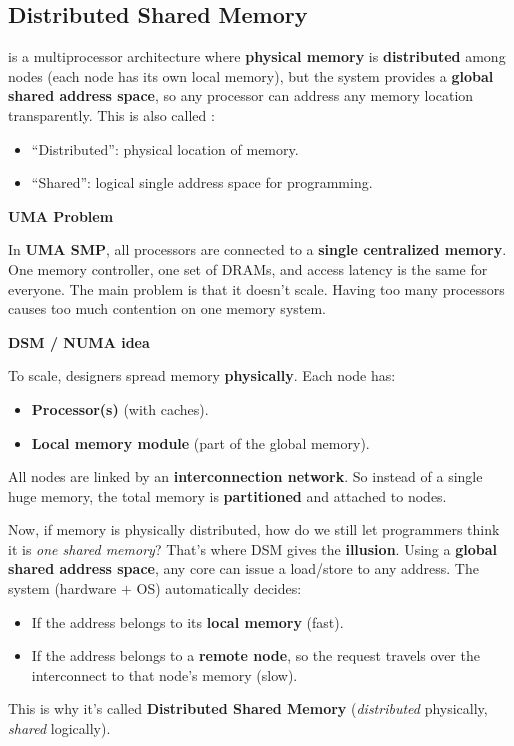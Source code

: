 \subsection{Distributed Shared Memory}\label{sec:DSM}

 is a multiprocessor architecture where \textbf{physical memory} is \textbf{distributed} among nodes (each node has its own local memory), but the system provides a \textbf{global shared address space}, so any processor can address any memory location transparently. This is also called :
\begin{itemize}
    \item ``Distributed'': physical location of memory.
    \item ``Shared'': logical single address space for programming.
\end{itemize}

\highspace
\begin{flushleft}
    \textcolor{Red2}{ \textbf{UMA Problem}}
\end{flushleft}
In \textbf{UMA SMP}, all processors are connected to a \textbf{single centralized memory}. One memory controller, one set of DRAMs, and access latency is the same for everyone. The main problem is that it doesn't scale. Having too many processors causes too much contention on one memory system.

\highspace
\begin{flushleft}
    \textcolor{Green3}{ \textbf{DSM / NUMA idea}}
\end{flushleft}
To scale, designers spread memory \textbf{physically}. Each node has:
\begin{itemize}
    \item \textbf{Processor(s)} (with caches).
    \item \textbf{Local memory module} (part of the global memory).
\end{itemize}
All nodes are linked by an \textbf{interconnection network}. So instead of a single huge memory, the total memory is \textbf{partitioned} and attached to nodes.

\highspace
Now, if memory is physically distributed, how do we still let programmers think it is \emph{one shared memory}? That's where DSM gives the \textbf{illusion}. Using a \textbf{global shared address space}, any core can issue a load/store to any address. The system (hardware $+$ OS) automatically decides:
\begin{itemize}
    \item If the address belongs to its \textbf{local memory} (fast).
    \item If the address belongs to a \textbf{remote node}, so the request travels over the interconnect to that node's memory (slow).
\end{itemize}
This is why it's called \textbf{Distributed Shared Memory} (\emph{distributed} physically, \emph{shared} logically).

